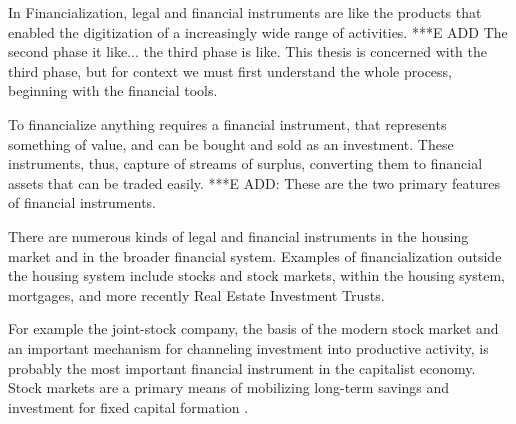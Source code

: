 In Financialization, legal and financial instruments are like the products that enabled the digitization of a increasingly wide range of activities. %
***E ADD The second phase it like... the third phase is like. This thesis is concerned with the third phase, but for context we must first understand the whole process, beginning with the financial tools. 


To financialize anything requires %
a \gls{financial instrument}, that represents something of value, and can be bought and sold as an investment. These instruments, thus, capture of streams of surplus, converting them to financial assets that can be traded easily. ***E ADD: These are the two primary features of financial instruments. 

There are numerous kinds of legal and financial instruments in the housing market and in the broader financial system. Examples of financialization outside the housing system include stocks and stock markets, within the housing system, mortgages, and more recently Real Estate Investment Trusts.

For example the \gls{joint-stock company}, the basis of the modern stock market and an important mechanism for channeling investment into productive activity,  is probably the most important financial instrument in the capitalist economy.  Stock markets are %
a primary means of %
mobilizing long-term savings and investment for fixed capital formation \cite{azfarMarketMobilizedCapital2003}.  

